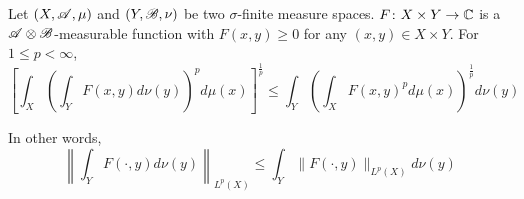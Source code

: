 \begin{prop}
	Let $(X,\mathscr{A},\mu)$ and $(Y,\mathscr{B},\nu)$ be two $\sigma$-finite measure spaces. $F \colon X \times Y \rightarrow \mathbb{C}$ is a $\mathscr{A} \otimes \mathscr{B}$-measurable function with $F(x,y) \geq 0$ for any $(x,y) \in X \times Y$. For $1 \leq p < \infty$,
	\begin{equation*}
		\left[\int_X\left(\int_Y F(x, y) d \nu(y)\right)^p d \mu(x)\right]^{\frac{1}{p}} \leq \int_Y\left(\int_X F(x, y)^p d \mu(x)\right)^{\frac{1}{p}} d \nu(y)
	\end{equation*}
\end{prop}
\begin{rmk}
	In other words,
	\begin{equation*}
		\left\|\int_Y F(\cdot, y) d \nu(y)\right\|_{L^p(X)} \leq \int_Y\|F(\cdot, y)\|_{L^p(X)} d \nu(y)
	\end{equation*}
\end{rmk}
